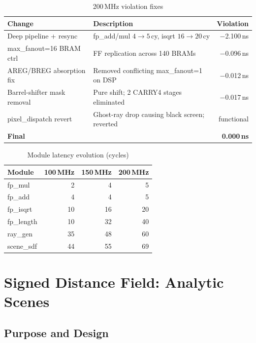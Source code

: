   \begin{table}[h!]
  \centering
  \caption{200\,MHz violation fixes}
  \begin{tabular}{llr}
  \hline
  \textbf{Change} & \textbf{Description} & \textbf{Violation} \\
  \hline
  Deep pipeline + resync      & fp\_add/mul $4\to5$\,cy, isqrt $16\to20$\,cy  & $-$2.100\,ns \\
  max\_fanout=16 BRAM ctrl    & FF replication across 140 BRAMs                & $-$0.096\,ns \\
  AREG/BREG absorption fix    & Removed conflicting max\_fanout=1 on DSP       & $-$0.012\,ns \\
  Barrel-shifter mask removal & Pure shift; 2 CARRY4 stages eliminated         & $-$0.017\,ns \\
  pixel\_dispatch revert      & Ghost-ray drop causing black screen; reverted   & functional   \\
  \textbf{Final}              &                                                & \textbf{0.000\,ns} \\
  \hline
  \end{tabular}
  \end{table}

  \begin{table}[h!]
  \centering
  \caption{Module latency evolution (cycles)}
  \begin{tabular}{lrrr}
  \hline
  \textbf{Module} & \textbf{100\,MHz} & \textbf{150\,MHz} & \textbf{200\,MHz} \\
  \hline
  fp\_mul    &  2 &  4 &  5 \\
  fp\_add    &  4 &  4 &  5 \\
  fp\_isqrt  & 10 & 16 & 20 \\
  fp\_length & 10 & 32 & 40 \\
  ray\_gen   & 35 & 48 & 60 \\
  scene\_sdf & 44 & 55 & 69 \\
  \hline
  \end{tabular}
  \end{table}
\section{Signed Distance Field: Analytic Scenes}

\subsection{Purpose and Design}

